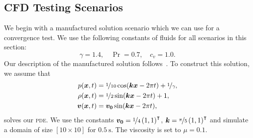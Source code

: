 \documentclass[runningheads]{llncs}
\newcommand{\pde}{\textsc{pde}}
\newcommand{\Qrho}{\rho}
\newcommand{\Qv}{\bm{v}}
\newcommand{\pressure}{p}
\begin{document}
\subsection{CFD Testing Scenarios}
We begin with a manufactured solution scenario which we can use for a convergence test.
We use the following constants of fluids for all scenarios in this section:
\begin{equation}
  \gamma = 1.4, \quad \Pr = 0.7, \quad c_v = 1.0.
\end{equation}
Our description of the manufactured solution follows~\cite{dumbser2010arbitrary}.
To construct this solution, we assume that
\begin{align}\label{eq:manufactured-solution}
  \begin{split}
    \pressure(\bm{x}, t) &= \nicefrac{1}{10} \cos( \bm{k} \bm{x} - 2 \pi t ) + \nicefrac{1}{\gamma}, \\
    \Qrho(\bm{x}, t) &= \nicefrac{1}{2} \sin (\bm{k} \bm{x} - 2 \pi t) + 1, \\
    \Qv(\bm{x}, t) &= \bm{v_0} \sin(\bm{k} \bm{x} - 2 \pi t),
  \end{split}
  \end{align}
solves our \pde{}.
We use the constants $\bm{v_0} = \nicefrac{1}{4} \left( 1, 1 \right)^\intercal$, $\bm{k} = \nicefrac{\pi}{5} \left( 1, 1 \right)^\intercal$ and simulate a domain of size $\left[ 10 \times 10 \right]$ for $\SI{0.5}{\s}$.
The viscosity is set to $\mu = 0.1$.
\end{document}
